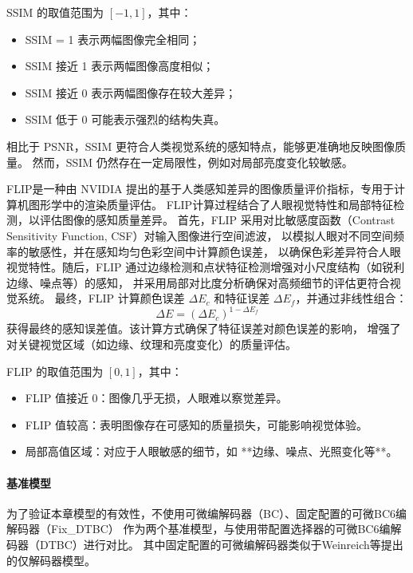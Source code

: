 SSIM 的取值范围为 $[-1,1]$，其中：
\begin{itemize}
    \item SSIM = 1 表示两幅图像完全相同；
    \item SSIM 接近 1 表示两幅图像高度相似；
    \item SSIM 接近 0 表示两幅图像存在较大差异；
    \item SSIM 低于 0 可能表示强烈的结构失真。
\end{itemize}

相比于 PSNR，SSIM 更符合人类视觉系统的感知特点，能够更准确地反映图像质量。
然而，SSIM 仍然存在一定局限性，例如对局部亮度变化较敏感。

FLIP是一种由 NVIDIA 提出的基于人类感知差异的图像质量评价指标，专用于计算机图形学中的渲染质量评估。
FLIP计算过程结合了人眼视觉特性和局部特征检测，以评估图像的感知质量差异。
首先，FLIP 采用对比敏感度函数（Contrast Sensitivity Function, CSF）对输入图像进行空间滤波，
以模拟人眼对不同空间频率的敏感性，并在感知均匀色彩空间中计算颜色误差，
以确保色彩差异符合人眼视觉特性。随后，FLIP 通过边缘检测和点状特征检测增强对小尺度结构（如锐利边缘、噪点等）的感知，
并采用局部对比度分析确保对高频细节的评估更符合视觉系统。
最终，FLIP 计算颜色误差 $\Delta E_c$ 和特征误差 $\Delta E_f$，并通过非线性组合：
\begin{equation}
    \Delta E = (\Delta E_c)^{1 - \Delta E_f}
\end{equation}
获得最终的感知误差值。该计算方式确保了特征误差对颜色误差的影响，
增强了对关键视觉区域（如边缘、纹理和亮度变化）的质量评估。

FLIP 的取值范围为 $[0,1]$，其中：
\begin{itemize}
    \item FLIP 值接近 0：图像几乎无损，人眼难以察觉差异。
    \item FLIP 值较高：表明图像存在可感知的质量损失，可能影响视觉体验。
    \item 局部高值区域：对应于人眼敏感的细节，如 **边缘、噪点、光照变化等**。
\end{itemize}

\paragraph{基准模型}

为了验证本章模型的有效性，不使用可微编解码器（BC）、固定配置的可微BC6编解码器（Fix\_DTBC）
作为两个基准模型，与使用带配置选择器的可微BC6编解码器（DTBC）进行对比。
其中固定配置的可微编解码器类似于Weinreich等\cite{weinreich2024real}提出的仅解码器模型。

